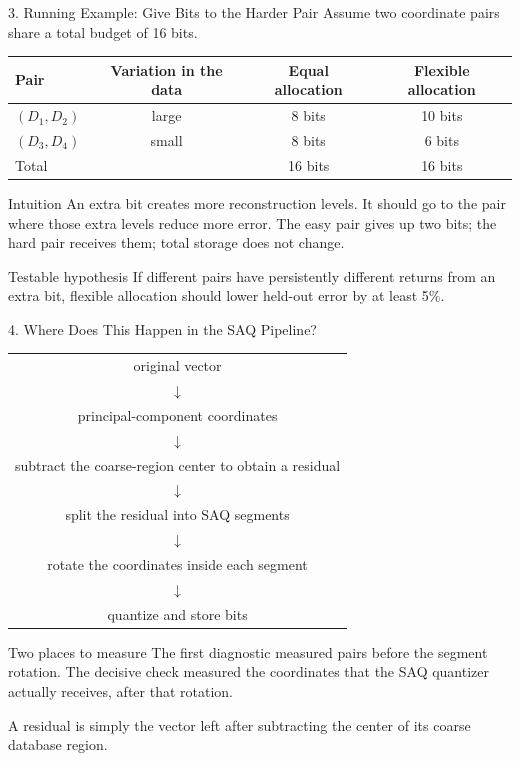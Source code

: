 \documentclass[aspectratio=169]{beamer}
\begin{document}
\begin{frame}{3. Running Example: Give Bits to the Harder Pair}
\small
Assume two coordinate pairs share a total budget of 16 bits.
\begin{center}
\begin{tabular}{lccc}
\toprule
Pair & Variation in the data & Equal allocation & Flexible allocation\\
\midrule
$(D_1,D_2)$ & large & 8 bits & 10 bits\\
$(D_3,D_4)$ & small & 8 bits & 6 bits\\
\midrule
Total & & 16 bits & 16 bits\\
\bottomrule
\end{tabular}
\end{center}
\begin{block}{Intuition}
An extra bit creates more reconstruction levels. It should go to the pair
where those extra levels reduce more error. The easy pair gives up two bits;
the hard pair receives them; total storage does not change.
\end{block}
\begin{alertblock}{Testable hypothesis}
If different pairs have persistently different returns from an extra bit,
flexible allocation should lower held-out error by at least 5\%.
\end{alertblock}
\end{frame}

\begin{frame}{4. Where Does This Happen in the SAQ Pipeline?}
\small
\begin{center}
\begin{tabular}{c}
original vector\\[-1mm]
$\downarrow$\\[-1mm]
principal-component coordinates\\[-1mm]
$\downarrow$\\[-1mm]
subtract the coarse-region center to obtain a residual\\[-1mm]
$\downarrow$\\[-1mm]
split the residual into SAQ segments\\[-1mm]
$\downarrow$\\[-1mm]
\alert{rotate the coordinates inside each segment}\\[-1mm]
$\downarrow$\\[-1mm]
quantize and store bits
\end{tabular}
\end{center}
\begin{block}{Two places to measure}
The first diagnostic measured pairs before the segment rotation. The decisive
check measured the coordinates that the SAQ quantizer actually receives,
after that rotation.
\end{block}
\scriptsize A residual is simply the vector left after subtracting the center
of its coarse database region.
\end{frame}
\end{document}
